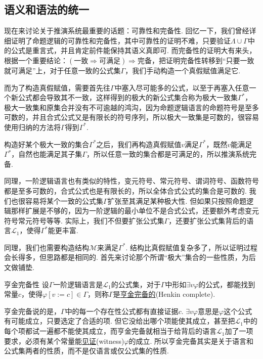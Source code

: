 \subsection{语义和语法的统一}

现在来讨论关于推演系统最重要的话题：可靠性和完备性. 回忆一下，我们曾经详细证明了命题逻辑的可靠性和完备性，其中可靠性的证明不难，只要验证\(\Lambda \cup \Gamma\)中的公式是重言式，并且肯定前件能保持其语义真即可. 而完备性的证明大有来头，根据一个重要结论：$(\text{一致}\Rightarrow\text{可满足})\Rightarrow\text{完备}$，把证明完备性转移到“只要一致就可满足”上，对于任意一致的公式集$\Gamma$，我们手动构造一个真假赋值满足它. 

而为了构造真假赋值，需要首先往\(\Gamma\)中塞入尽可能多的公式，以至于再塞入任意一个新公式都会导致其不一致，这样得到的极大的新公式集合称为极大一致集$\Gamma^*$，极大一致集和原集合并没有不可逾越的鸿沟，因为命题逻辑语言的命题符号是至多可数的，并且合式公式又是有限长的符号序列，所以极大一致集是可数的，很容易使用归纳的方法将$\Gamma$得到$\Gamma^*$. 

构造好某个极大一致的集合$\Gamma^*$之后，我们再构造真假赋值$v$满足$\Gamma^*$，既然$v$能满足$\Gamma^*$，自然也能满足其子集$\Gamma$，所以任意一致的集合都是可满足的，所以推演系统完备.

同理，一阶逻辑语言也有类似的特性，变元符号、常元符号、谓词符号、函数符号都是至多可数的，合式公式也是有限长的，所以全体合式公式的集合是可数的. 我们也很容易将某个一致的公式集$\Gamma$扩张至其满足某种极大性. 但如果只按照命题逻辑那样扩展是不够的，因为一阶逻辑的最小单位不是合式公式，还要额外考虑变元符号常元符号等等. 实际上，我们不但要扩张公式集$\Gamma$，还要扩张公式集背后的语言$\mathcal{L}_1$，使得$\Gamma^*$能更丰富.

同理，我们也需要构造结构$\mathcal{M}$来满足$\Gamma^*$. 结构比真假赋值复杂多了，所以证明过程会长得多，但思路都是相同的. 首先来讨论那个所谓“极大”集合的一些性质，为后文做铺垫.

\begin{definition}{亨金完备性}
    设$\Gamma$一阶逻辑语言是$\mathcal{L}_1$的公式集，对于$\Gamma$中形如$\exists v \varphi$的公式，都能找到常量$c$，使得$\varphi[v:=c] \in \Gamma$，则称$\Gamma$是\underline{亨金完备的}(Henkin complete).
\end{definition}

亨金完备说的是，$\Gamma$中的每一个存在性公式都有直接证据$c$. $\exists v \varphi$意思是$\varphi$这个公式有可能成立，只要选定了合适的项. 但它没给出哪个项能使其成立，甚至把$\mathcal{L}_1$中的每个项都试一遍都不能使其成立，而亨金完备就相当于给背后的语言$\mathcal{L}_1$加了一项要求，必须有某个常量能\underline{见证}(witness)$\varphi$的成立. 所以亨金完备其实是关于语言和公式集两者的性质，而不是仅语言或仅公式集的性质.

